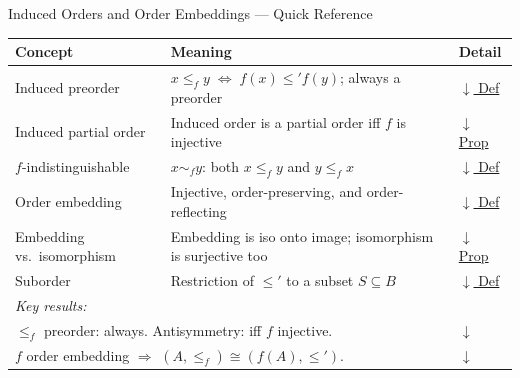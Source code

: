 \begin{toolkitbox}{Induced Orders and Order Embeddings --- Quick Reference}
\small
\begin{tabular}{l l l}
\toprule
\textbf{Concept} & \textbf{Meaning} & \textbf{Detail} \\
\midrule
Induced preorder    & $x \leq_f y \;\Leftrightarrow\; f(x) \leq' f(y)$; always a preorder  & \hyperref[def:induced-order]{$\downarrow$ Def} \\
Induced partial order & Induced order is a partial order iff $f$ is injective              & \hyperref[prop:induced-poset]{$\downarrow$ Prop} \\
$f$-indistinguishable & $x \sim_f y$: both $x \leq_f y$ and $y \leq_f x$                   & \hyperref[def:f-indist]{$\downarrow$ Def} \\
Order embedding     & Injective, order-preserving, and order-reflecting                     & \hyperref[def:order-embedding]{$\downarrow$ Def} \\
Embedding vs.\ isomorphism & Embedding is iso onto image; isomorphism is surjective too & \hyperref[prop:embedding-iso]{$\downarrow$ Prop} \\
Suborder            & Restriction of $\leq'$ to a subset $S \subseteq B$                   & \hyperref[def:suborder]{$\downarrow$ Def} \\
\midrule
\multicolumn{2}{l}{\textit{Key results:}} & \\
\midrule
\multicolumn{2}{l}{$\leq_f$ preorder: always. \quad Antisymmetry: iff $f$ injective.}       & \hyperref[prop:induced-poset]{$\downarrow$} \\
\multicolumn{2}{l}{$f$ order embedding $\Rightarrow$ $(A,\leq_f) \cong (f(A), \leq')$.}    & \hyperref[prop:embedding-iso]{$\downarrow$} \\
\bottomrule
\end{tabular}
\end{toolkitbox}


